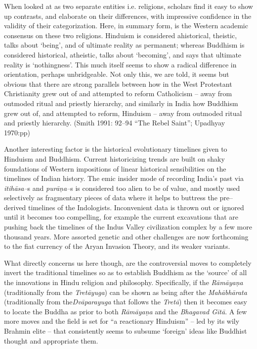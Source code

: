 When looked at as two separate entities i.e. religions, scholars find it easy to show up contrasts, and elaborate on their differences, with impressive confidence in the validity of their categorization. Here, in summary form, is the Western academic consensus on these two religions. Hinduism is considered ahistorical, theistic, talks about ‘being’, and of ultimate reality as permanent; whereas Buddhism is considered historical, atheistic, talks about ‘becoming’, and says that ultimate reality is ‘nothingness’. This much itself seems to show a radical difference in orientation, perhaps unbridgeable. Not only this, we are told, it seems but obvious that there are strong parallels between how in the West Protestant Christianity grew out of and attempted to reform Catholicism – away from outmoded ritual and priestly hierarchy, and similarly in India how Buddhism grew out of, and attempted to reform, Hinduism – away from outmoded ritual and priestly hierarchy. (Smith 1991: 92–94 “The Rebel Saint”; Upadhyay 1970:pp)

Another interesting factor is the historical evolutionary timelines given to Hinduism and Buddhism. Current historicizing trends are built on shaky foundations of Western impositions of linear historical sensibilities on the timelines of Indian history. The emic insider mode of recording India’s past via \textit{itihāsa–}s and \textit{purāṇa–}s is considered too alien to be of value, and mostly used selectively as fragmentary pieces of data where it helps to buttress the pre–derived timelines of the Indologists. Inconvenient data is thrown out or ignored until it becomes too compelling, for example the current excavations that are pushing back the timelines of the Indus Valley civilization complex by a few more thousand years. More assorted genetic and other challenges are now forthcoming to the fiat currency of the Aryan Invasion Theory, and its weaker variants.

What directly concerns us here though, are the controversial moves to completely invert the traditional timelines so as to establish Buddhism as the ‘source’ of all the innovations in Hindu religion and philosophy. Specifically, if the \textit{Rāmāyaṇa} (traditionally from the \textit{Tretāyuga}) can be shown as being after the \textit{Mahābhārata} (traditionally from the\textit{Dvāparayuga} that follows the \textit{Tretā}) then it becomes easy to locate the Buddha as prior to both \textit{Rāmāyaṇa} and the \textit{Bhagavad Gītā}. A few more moves and the field is set for “a reactionary Hinduism” – led by its wily Brahmin elite – that consistently seems to subsume ‘foreign’ ideas like Buddhist thought and appropriate them.

